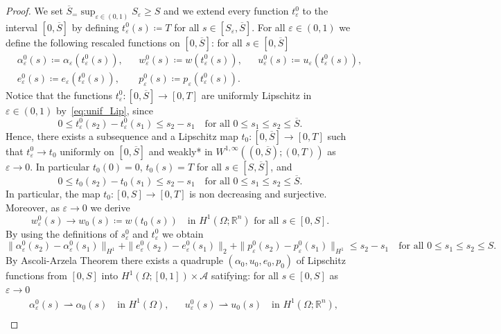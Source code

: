 \documentclass[reqno]{amsart}
\theoremstyle{definition}
\numberwithin{equation}{section}
\def\R {\mathbb R}
\begin{document}
\begin{proof}
We set $\overline S_=\sup_{\varepsilon\in(0,1)}S_\varepsilon\ge S$ and we extend every function $t_\varepsilon^0$ to the interval $[0,\overline S]$ by defining $t_\varepsilon^0(s)\coloneqq T$ for all $s\in[S_\varepsilon,\overline S]$. For all $\varepsilon\in(0,1)$ we define the following rescaled functions on $[0,\overline S]$: for all $s\in[0,\overline S]$
\begin{align*}
&\alpha_\varepsilon^0(s)\coloneqq \alpha_\varepsilon(t_\varepsilon^0(s)), & &w_\varepsilon^0(s)\coloneqq w(t_\varepsilon^0(s)),& & u_\varepsilon^0(s)\coloneqq  u_\varepsilon(t_\varepsilon^0(s)),\\
&e_\varepsilon^0(s)\coloneqq  e_\varepsilon(t_\varepsilon^0(s)),& &p_\varepsilon^0(s)\coloneqq p_\varepsilon(t_\varepsilon^0(s)). & &
\end{align*}
Notice that the functions $t_\varepsilon^0\colon [0,\overline S]\to [0,T]$ are uniformly Lipschitz in $\varepsilon\in(0,1)$ by~\eqref{eq:unif_Lip}, since
$$0\le t_\varepsilon^0(s_2)-t_\varepsilon^0(s_1)\le s_2-s_1\quad\text{for all $0\le s_1\le s_2\le \overline S$}.$$
Hence, there exists a subsequence and a Lipschitz map $t_0\colon [0,\overline S]\to [0,T]$ such that $t_\varepsilon^0\to t_0$ uniformly on $[0, \overline S]$ and weakly* in $W^{1,\infty}((0,\overline S);(0,T))$ as $\varepsilon\to 0$. In particular $t_0(0)=0$, $t_0(s)=T$ for all $s\in[S,\overline S]$, and 
$$0\le t_0(s_2)-t_0(s_1)\le s_2-s_1\quad\text{for all $0\le s_1\le s_2\le \overline S$}.$$
In particular, the map $t_0\colon [0,S]\to [0,T]$ is non decreasing and surjective. Moreover, as $\varepsilon\to 0$ we derive
$$w_\varepsilon^0(s)\to w_0(s)\coloneqq w(t_0(s))\quad\text{in $H^1(\Omega;\R^n)$ for all $s\in[0,S]$}.$$
By using the definitions of $s_\varepsilon^0$ and $t_\varepsilon^0$ we obtain
\begin{equation}\label{eq:1lip}
 \|\alpha_\varepsilon^0(s_2)-\alpha_\varepsilon^0(s_1)\|_{H^1}+\|e_\varepsilon^0(s_2)-e_\varepsilon^0(s_1)\|_2+\|p_\varepsilon^0(s_2)-p_\varepsilon^0(s_1)\|_{H^1}\le s_2-s_1\quad\text{for all $0\le s_1\le s_2\le S$}.
\end{equation}
By Ascoli-Arzela Theorem there exists a quadruple $(\alpha_0,u_0,e_0,p_0)$ of Lipschitz functions from $[0,S]$ into $H^1(\Omega;[0,1])\times \mathcal A$ satifying: for all $s\in[0,S]$ as $\varepsilon\to 0$ 
\begin{align}
& \alpha_\varepsilon^0(s)\rightharpoonup \alpha_0(s)\quad\text{in $H^1(\Omega)$}, & & u_\varepsilon^0(s)\rightharpoonup u_0(s)\quad\text{in $H^1(\Omega;\R^n)$},\label{eq:0con1}\\

\end{align}
\end{proof}
\end{document}
